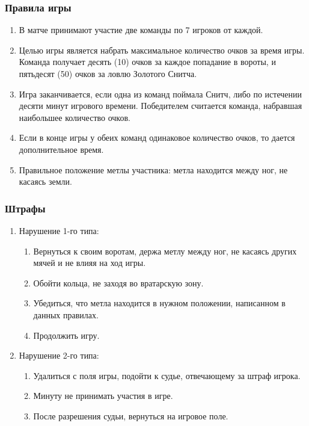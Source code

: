 \subsubsection*{Правила игры}
\begin{enumerate}
\item В матче принимают участие две команды по 7 игроков от каждой.
\item Целью игры является набрать максимальное количество очков за время игры. Команда получает десять (10) очков за каждое попадание в вороты, и пятьдесят (50) очков за ловлю Золотого Снитча.
\item Игра заканчивается, если одна из команд поймала Снитч, либо по истечении десяти минут игрового времени. Победителем считается команда, набравшая наибольшее количество очков.
\item Если в конце игры у обеих команд одинаковое количество очков, то дается дополнительное время.
\item Правильное положение метлы участника: метла находится между ног, не касаясь земли.
\end{enumerate}


\subsubsection*{Штрафы}
\begin{enumerate}
\item Нарушение 1-го типа:
	\begin{enumerate}
	\item Вернуться к своим воротам, держа метлу между ног, не касаясь других мячей и не влияя на ход игры.
	\item Обойти кольца, не заходя во вратарскую зону.
	\item Убедиться, что метла находится в нужном положении, написанном в данных правилах.
	\item Продолжить игру.
	\end{enumerate}
	
\item Нарушение 2-го типа:
	\begin{enumerate}
	\item Удалиться с поля игры, подойти к судье, отвечающему за штраф игрока.
	\item Минуту не принимать участия в игре.
	\item После разрешения судьи, вернуться на игровое поле.
	\end{enumerate}
\end{enumerate}



